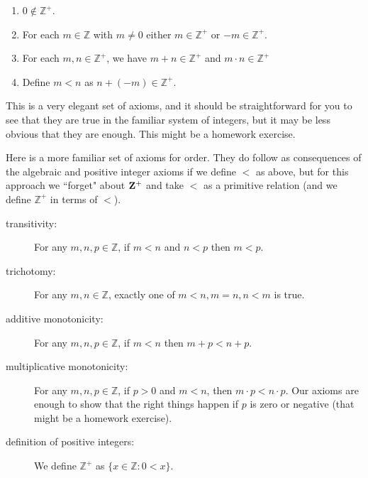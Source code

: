 \documentclass[12pt]{article}
\begin{document}
\begin{enumerate}

\item $0 \not\in {\mathbb Z}^+$.

\item  For each $m \in {\mathbb Z}$ with $m \neq 0$ either $m \in {\mathbb Z}^+$ or  $-m \in {\mathbb Z}^+$.

\item For each $m,n \in {\mathbb Z}^+$, we have $m+n \in {\mathbb Z}^+$ and $m\cdot n \in {\mathbb Z}^+$

\item Define $m<n$ as $n+(-m) \in {\mathbb Z}^+$.

\end{enumerate}

This is a very elegant set of axioms, and it should be straightforward for you to see that they are true in the familiar system of integers, but it may be less obvious that they are enough.  This might be a homework exercise.

Here is a more familiar set of axioms for order.  They do follow as consequences of the algebraic and positive integer axioms if we define $<$ as above, but for this approach we ``forget" about ${\bf Z}^+$ and take $<$ as a primitive relation (and we define ${\mathbb Z}^+$ in terms of $<$).

\begin{description}

\item[transitivity:]  For any $m,n,p \in {\mathbb Z}$,  if $m<n$ and $n<p$ then $m<p$.

\item[trichotomy:]  For any $m,n \in {\mathbb Z}$, exactly one of $m<n,m=n,n<m$ is true.

\item[additive monotonicity:]  For any $m,n,p \in {\mathbb Z}$, if $m<n$ then $m+p < n+p$.

\item[multiplicative monotonicity:]  For any $m,n,p \in {\mathbb Z}$, if $p  > 0$ and $m<n$, then $m\cdot p <n\cdot p$.  Our axioms are enough to show that the right things happen if $p$ is zero or negative (that might be a homework exercise).

\item  [definition of positive integers:]  We define ${\mathbb Z}^+$ as $\{x \in {\mathbb Z}:0<x\}$.

\end{description}
\end{document}
